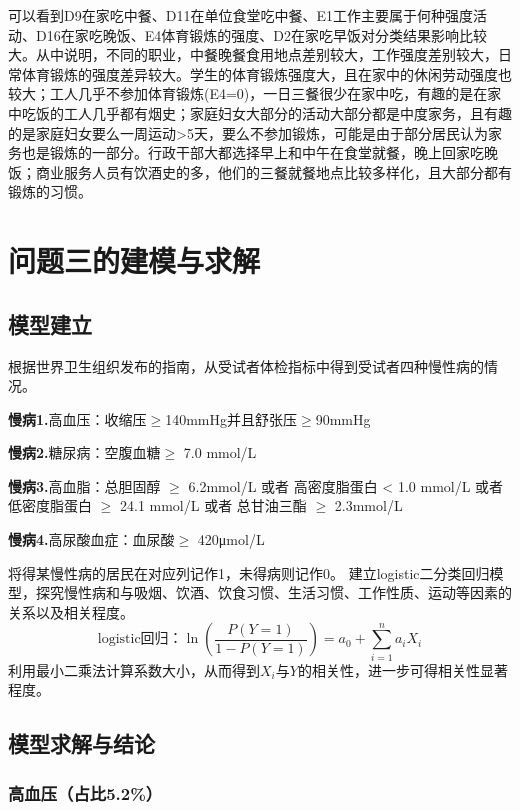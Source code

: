 \documentclass{article}
\numberwithin{equation}{subsection}
\begin{document}
可以看到D9在家吃中餐、D11在单位食堂吃中餐、E1工作主要属于何种强度活动、D16在家吃晚饭、E4体育锻炼的强度、D2在家吃早饭对分类结果影响比较大。从中说明，不同的职业，中餐晚餐食用地点差别较大，工作强度差别较大，日常体育锻炼的强度差异较大。学生的体育锻炼强度大，且在家中的休闲劳动强度也较大；工人几乎不参加体育锻炼(E4=0)，一日三餐很少在家中吃，有趣的是在家中吃饭的工人几乎都有烟史；家庭妇女大部分的活动大部分都是中度家务，且有趣的是家庭妇女要么一周运动>5天，要么不参加锻炼，可能是由于部分居民认为家务也是锻炼的一部分。行政干部大都选择早上和中午在食堂就餐，晚上回家吃晚饭；商业服务人员有饮酒史的多，他们的三餐就餐地点比较多样化，且大部分都有锻炼的习惯。

{\centering\section{问题三的建模与求解}}
\subsection{模型建立}
根据世界卫生组织发布的指南，从受试者体检指标中得到受试者四种慢性病的情况。

\textbf{慢病1.}高血压：收缩压$\geq$140mmHg并且舒张压$\geq$90mmHg

\textbf{慢病2.}糖尿病：空腹血糖$\geq$ 7.0 mmol/L

\textbf{慢病3.}高血脂：总胆固醇 $\geq$ 6.2mmol/L 或者 高密度脂蛋白 < 1.0 mmol/L 或者 低密度脂蛋白 $\geq$ 24.1 mmol/L 或者 总甘油三酯 $\geq$ 2.3mmol/L

\textbf{慢病4.}高尿酸血症：血尿酸$\geq$ 420μmol/L

将得某慢性病的居民在对应列记作1，未得病则记作0。
建立logistic二分类回归模型，探究慢性病和与吸烟、饮酒、饮食习惯、生活习惯、工作性质、运动等因素的关系以及相关程度。
\begin{equation}
    \text{logistic回归：}\ln (\frac{P(Y=1)}{1-P(Y=1)}) = a_0 + \sum_{i=1}^{n}a_iX_i
\end{equation}
利用最小二乘法计算系数大小，从而得到$X_i$与$Y$的相关性，进一步可得相关性显著程度。

\subsection{模型求解与结论}

\subsubsection{高血压（占比5.2\%）}
\end{document}
